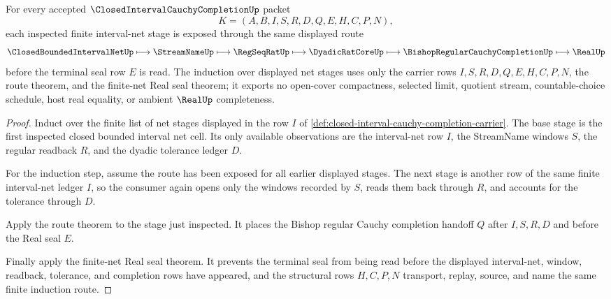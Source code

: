 \begin{theorem}
\label{thm:closed-interval-cauchy-completion-net-induction}
For every accepted $\ClosedIntervalCauchyCompletionUp$ packet
$$
K=(A,B,I,S,R,D,Q,E,H,C,P,N),
$$
each inspected finite interval-net stage is exposed through the same displayed route
$$
\ClosedBoundedIntervalNetUp \longmapsto \StreamNameUp \longmapsto \RegSeqRatUp \longmapsto \DyadicRatCoreUp \longmapsto \BishopRegularCauchyCompletionUp \longmapsto \RealUp
$$
before the terminal seal row $E$ is read. The induction over displayed net stages uses only the carrier rows $I,S,R,D,Q,E,H,C,P,N$, the route theorem, and the finite-net Real seal theorem; it exports no open-cover compactness, selected limit, quotient stream, countable-choice schedule, host real equality, or ambient $\RealUp$ completeness.
\end{theorem}
\begin{proof}
Induct over the finite list of net stages displayed in the row $I$ of \autoref{def:closed-interval-cauchy-completion-carrier}. The base stage is the first inspected closed bounded interval net cell. Its only available observations are the interval-net row $I$, the StreamName windows $S$, the regular readback $R$, and the dyadic tolerance ledger $D$.

For the induction step, assume the route has been exposed for all earlier displayed stages. The next stage is another row of the same finite interval-net ledger $I$, so the consumer again opens only the windows recorded by $S$, reads them back through $R$, and accounts for the tolerance through $D$.

Apply the route theorem to the stage just inspected. It places the Bishop regular Cauchy completion handoff $Q$ after $I,S,R,D$ and before the Real seal $E$.

Finally apply the finite-net Real seal theorem. It prevents the terminal seal from being read before the displayed interval-net, window, readback, tolerance, and completion rows have appeared, and the structural rows $H,C,P,N$ transport, replay, source, and name the same finite induction route.
\end{proof}


